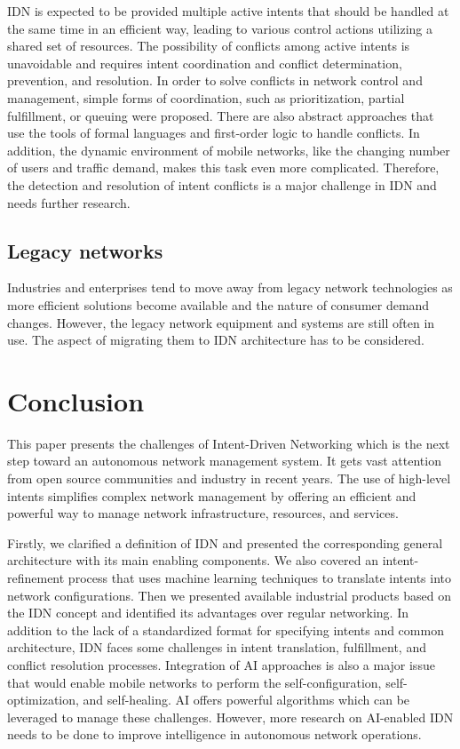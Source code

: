 IDN is expected to be provided multiple active intents that should be handled at the same time in an efficient way, leading to various control actions utilizing a shared set of resources. The possibility of conflicts among active intents is unavoidable and requires intent coordination and conflict determination, prevention, and resolution. In order to solve conflicts in network control and management, simple forms of coordination, such as prioritization, partial fulfillment, or queuing were proposed. There are also abstract approaches that use the tools of formal languages and first-order logic to handle conflicts. In addition, the dynamic environment of mobile networks, like the changing number of users and traffic demand, makes this task even more complicated. Therefore, the detection and resolution of intent conflicts is a major challenge in IDN and needs further research. \cite{Mwanje2021}


\subsection{Legacy networks}
Industries and enterprises tend to move away from legacy network technologies as more efficient solutions become available and the nature of consumer demand changes. However, the legacy network equipment and systems are still often in use. The aspect of migrating them to IDN architecture has to be considered. \cite{Saha2018}


\section{Conclusion}
\label{sec:Conclusion}

This paper presents the challenges of Intent-Driven Networking which is the next step toward an autonomous network management system. It gets vast attention from open source communities and industry in recent years. The use of high-level intents simplifies complex network management by offering an efficient and powerful way to manage network infrastructure, resources, and services.

Firstly, we clarified a definition of IDN and presented the corresponding general architecture with its main enabling components. We also covered an intent-refinement process that uses machine learning techniques to translate intents into network configurations. Then we presented available industrial products based on the IDN concept and identified its advantages over regular networking. In addition to the lack of a standardized format for specifying intents and common architecture, IDN faces some challenges in intent translation, fulfillment, and conflict resolution processes. Integration of AI approaches is also a major issue that would enable mobile networks to perform the self-configuration, self-optimization, and self-healing. AI offers powerful algorithms which can be leveraged to manage these challenges. However, more research on AI-enabled IDN needs to be done to improve intelligence in autonomous network operations.

\printbibliography[heading=bibintoc]





